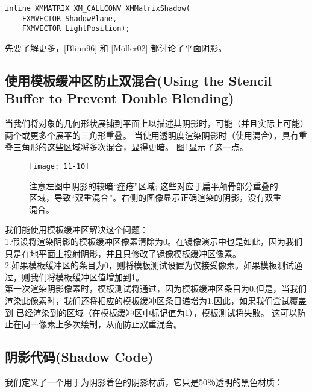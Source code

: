\begin{lstlisting}
inline XMMATRIX XM_CALLCONV XMMatrixShadow(
    FXMVECTOR ShadowPlane,
    FXMVECTOR LightPosition);
\end{lstlisting}

\begin{flushleft}
先要了解更多，[Blinn96] 和 [Möller02] 都讨论了平面阴影。
\end{flushleft}

\subsection{使用模板缓冲区防止双混合(Using the Stencil Buffer to Prevent Double Blending)}
\begin{flushleft}
当我们将对象的几何形状展铺到平面上以描述其阴影时，可能（并且实际上可能）两个或更多个展平的三角形重叠。 当使用透明度渲染阴影时（使用混合），具有重叠三角形的这些区域将多次混合，显得更暗。 图\ref{fig:11-10}显示了这一点。\\
\end{flushleft}

\begin{figure}[h]
    \texttt{[image: 11-10]}
    \centering
    \caption{注意左图中阴影的较暗“痤疮”区域; 这些对应于扁平颅骨部分重叠的区域，导致“双重混合”。右侧的图像显示正确渲染的阴影，没有双重混合。}
    \label{fig:11-10}
\end{figure}

\begin{flushleft}
我们能使用模板缓冲区解决这个问题：\\
1.假设将渲染阴影的模板缓冲区像素清除为0。在镜像演示中也是如此，因为我们只是在地平面上投射阴影，并且只修改了镜像模板缓冲区像素。\\
2.如果模板缓冲区的条目为0，则将模板测试设置为仅接受像素。如果模板测试通过，则我们将模板缓冲区值增加到1。\\

第一次渲染阴影像素时，模板测试将通过，因为模板缓冲区条目为0.但是，当我们渲染此像素时，我们还将相应的模板缓冲区条目递增为1.因此，如果我们尝试覆盖到 已经渲染到的区域（在模板缓冲区中标记值为1），模板测试将失败。 这可以防止在同一像素上多次绘制，从而防止双重混合。\\
\end{flushleft}


\subsection{阴影代码(Shadow Code)}
\begin{flushleft}
我们定义了一个用于为阴影着色的阴影材质，它只是50％透明的黑色材质：\\
\end{flushleft}

